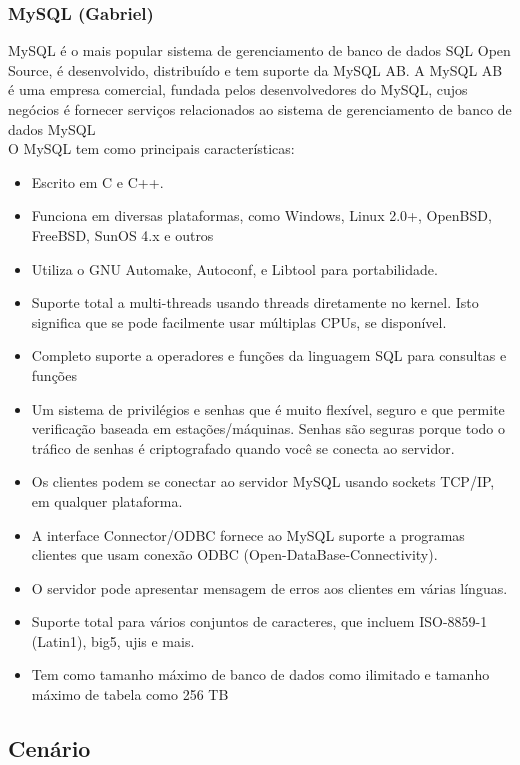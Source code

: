 \documentclass[conference]{IEEEtran}
\begin{document}
    \subsubsection{MySQL (Gabriel)}
	MySQL é o mais popular sistema de gerenciamento de banco de dados SQL Open Source, é desenvolvido, distribuído e tem suporte da MySQL AB. A MySQL AB é uma empresa comercial, fundada pelos desenvolvedores do MySQL, cujos negócios é fornecer serviços relacionados ao sistema de gerenciamento de banco de dados MySQL\\
	O MySQL tem como principais características:
\begin{itemize}
\item Escrito em C e C++.
\item Funciona em diversas plataformas, como Windows, Linux 2.0+, OpenBSD, FreeBSD, SunOS 4.x e outros
\item Utiliza o GNU Automake, Autoconf, e Libtool para portabilidade.
\item Suporte total a multi-threads usando threads diretamente no kernel. Isto significa que se pode facilmente usar múltiplas CPUs, se disponível.
\item Completo suporte a operadores e funções da linguagem SQL para consultas e funções
\item Um sistema de privilégios e senhas que é muito flexível, seguro e que permite verificação baseada em estações/máquinas. Senhas são seguras porque todo o tráfico de senhas é criptografado quando você se conecta ao servidor.
\item Os clientes podem se conectar ao servidor MySQL usando sockets TCP/IP, em qualquer plataforma.
\item A interface Connector/ODBC fornece ao MySQL suporte a programas clientes que usam conexão ODBC (Open-DataBase-Connectivity). 
\item O servidor pode apresentar mensagem de erros aos clientes em várias línguas. 
\item Suporte total para vários conjuntos de caracteres, que incluem ISO-8859-1 (Latin1), big5, ujis e mais.
\item Tem como tamanho máximo de banco de dados como ilimitado e tamanho máximo de tabela como 256 TB
\end{itemize}


  \subsection{Cenário}
\end{document}
